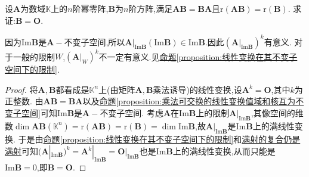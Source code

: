 \documentclass[../../main.tex]{subfiles}
\begin{document}
\begin{example}
设\(\boldsymbol{A}\)为数域\(\mathbb{K}\)上的\(n\)阶幂零阵,\(\boldsymbol{B}\)为\(n\)阶方阵,满足\(\boldsymbol{A}\boldsymbol{B}=\boldsymbol{B}\boldsymbol{A}\)且\(\text{r}(\boldsymbol{A}\boldsymbol{B})=\text{r}(\boldsymbol{B})\). 求证:\(\boldsymbol{B}=\boldsymbol{O}\).
\end{example}
\begin{remark}
因为$\text{Im}\boldsymbol{B}$是$\boldsymbol{A}-$不变子空间,所以\(\boldsymbol{A}|_{\text{Im}\boldsymbol{B}}(\text{Im}\boldsymbol{B})\in \text{Im}\boldsymbol{B}\).因此$(\boldsymbol{A}|_{\text{Im}\boldsymbol{B}})^k $有意义.
对于一般的限制$W$,$(\boldsymbol{A}|_{W})^k $不一定有意义.见\hyperref[proposition:线性变换在其不变子空间下的限制]{命题\ref{proposition:线性变换在其不变子空间下的限制}}.
\end{remark}
\begin{proof}
将\(\boldsymbol{A},\boldsymbol{B}\)都看成是\(\mathbb{K}^n\)上(由矩阵\(\boldsymbol{A},\boldsymbol{B}\)乘法诱导)的线性变换,设\(\boldsymbol{A}^k = \boldsymbol{O}\),其中\(k\)为正整数. 由\(\boldsymbol{A}\boldsymbol{B}=\boldsymbol{B}\boldsymbol{A}\)以及\hyperref[proposition:乘法可交换的线性变换值域和核互为不变子空间]{命题\ref{proposition:乘法可交换的线性变换值域和核互为不变子空间}}可知\(\text{Im}\boldsymbol{B}\)是\(\boldsymbol{A}-\)不变子空间. 考虑\(\boldsymbol{A}\)在\(\text{Im}\boldsymbol{B}\)上的限制\(\boldsymbol{A}|_{\text{Im}\boldsymbol{B}}\),其像空间的维数\(\dim\boldsymbol{A}\boldsymbol{B}(\mathbb{K}^n)=\text{r}(\boldsymbol{A}\boldsymbol{B})=\text{r}(\boldsymbol{B})=\dim\text{Im}\boldsymbol{B}\),故\(\boldsymbol{A}|_{\text{Im}\boldsymbol{B}}\)是\(\text{Im}\boldsymbol{B}\)上的满线性变换. 于是由\hyperref[proposition:线性变换在其不变子空间下的限制]{命题\ref{proposition:线性变换在其不变子空间下的限制}}和\hyperref[proposition:满射的复合仍是满射]{满射的复合仍是满射}可知\((\boldsymbol{A}|_{\text{Im}\boldsymbol{B}})^k = \boldsymbol{A}^k|_{\text{Im}\boldsymbol{B}}=\boldsymbol{O}|_{\text{Im}\boldsymbol{B}}\)也是\(\text{Im}\boldsymbol{B}\)上的满线性变换,从而只能是\(\text{Im}\boldsymbol{B}=0\),即\(\boldsymbol{B}=\boldsymbol{O}\). 
\end{proof}
\end{document}
